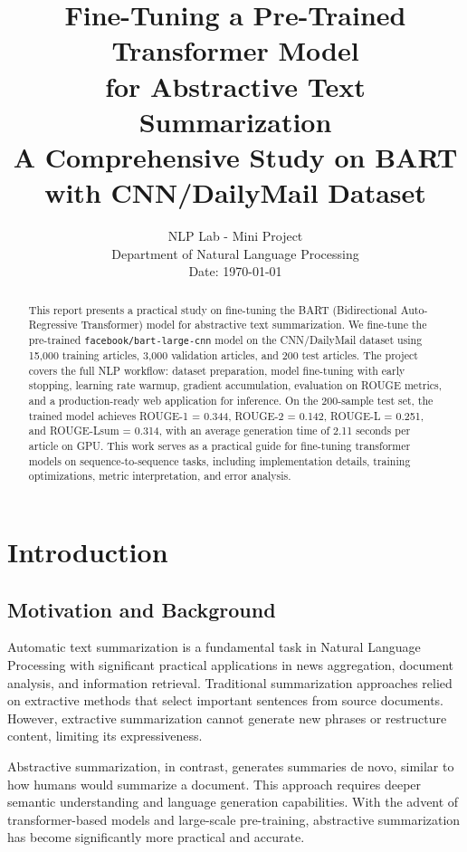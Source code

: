 \documentclass[12pt,a4paper,oneside]{report}
\title{
    \textbf{\Large Fine-Tuning a Pre-Trained Transformer Model\\
    for Abstractive Text Summarization}\\
    \vspace{0.5cm}
    \large A Comprehensive Study on BART with CNN/DailyMail Dataset
}
\author{
    NLP Lab - Mini Project\\
    Department of Natural Language Processing\\
    \vspace{0.3cm}
    Date: \today
}
\date{}
\begin{document}
\maketitle

\begin{abstract}
    This report presents a practical study on fine-tuning the BART (Bidirectional Auto-Regressive Transformer) model for abstractive text summarization. We fine-tune the pre-trained \texttt{facebook/bart-large-cnn} model on the CNN/DailyMail dataset using 15,000 training articles, 3,000 validation articles, and 200 test articles. The project covers the full NLP workflow: dataset preparation, model fine-tuning with early stopping, learning rate warmup, gradient accumulation, evaluation on ROUGE metrics, and a production-ready web application for inference. On the 200-sample test set, the trained model achieves ROUGE-1 = 0.344, ROUGE-2 = 0.142, ROUGE-L = 0.251, and ROUGE-Lsum = 0.314, with an average generation time of 2.11 seconds per article on GPU. This work serves as a practical guide for fine-tuning transformer models on sequence-to-sequence tasks, including implementation details, training optimizations, metric interpretation, and error analysis.
\end{abstract}

\tableofcontents
\newpage

\chapter{Introduction}
\label{ch:introduction}

\section{Motivation and Background}
Automatic text summarization is a fundamental task in Natural Language Processing with significant practical applications in news aggregation, document analysis, and information retrieval. Traditional summarization approaches relied on extractive methods that select important sentences from source documents. However, extractive summarization cannot generate new phrases or restructure content, limiting its expressiveness.

Abstractive summarization, in contrast, generates summaries de novo, similar to how humans would summarize a document. This approach requires deeper semantic understanding and language generation capabilities. With the advent of transformer-based models and large-scale pre-training, abstractive summarization has become significantly more practical and accurate.
\end{document}
